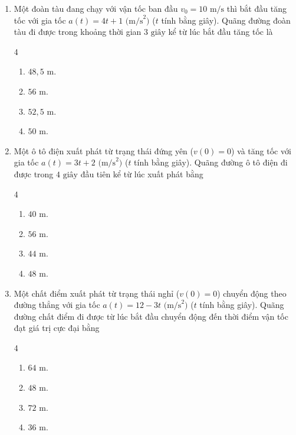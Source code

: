 \documentclass[12pt]{article}
\begin{document}
\begin{enumerate}[label=\textbf{Câu \arabic*.}]
		\item Một đoàn tàu đang chạy với vận tốc ban đầu $v_0 = 10\text{ m/s}$ thì bắt đầu tăng tốc với gia tốc $a(t) = 4t + 1\text{ (m/s}^2\text{)}$ ($t$ tính bằng giây). Quãng đường đoàn tàu đi được trong khoảng thời gian $3\text{ giây}$ kể từ lúc bắt đầu tăng tốc là
		\begin{multicols}{4}
			\begin{enumerate}[label=\textbf{\Alph*.}]
				\item $48{,}5\text{ m}$.
				\item $56\text{ m}$.
				\item $52{,}5\text{ m}$.
				\item $50\text{ m}$.
			\end{enumerate}
		\end{multicols}
		
		\item Một ô tô điện xuất phát từ trạng thái đứng yên ($v(0) = 0$) và tăng tốc với gia tốc $a(t) = 3t + 2\text{ (m/s}^2\text{)}$ ($t$ tính bằng giây). Quãng đường ô tô điện đi được trong $4\text{ giây}$ đầu tiên kể từ lúc xuất phát bằng
		\begin{multicols}{4}
			\begin{enumerate}[label=\textbf{\Alph*.}]
				\item $40\text{ m}$.
				\item $56\text{ m}$.
				\item $44\text{ m}$.
				\item $48\text{ m}$.
			\end{enumerate}
		\end{multicols}
		
		\item Một chất điểm xuất phát từ trạng thái nghỉ ($v(0) = 0$) chuyển động theo đường thẳng với gia tốc $a(t) = 12 - 3t\text{ (m/s}^2\text{)}$ ($t$ tính bằng giây). Quãng đường chất điểm đi được từ lúc bắt đầu chuyển động đến thời điểm vận tốc đạt giá trị cực đại bằng
		\begin{multicols}{4}
			\begin{enumerate}[label=\textbf{\Alph*.}]
				\item $64\text{ m}$.
				\item $48\text{ m}$.
				\item $72\text{ m}$.
				\item $36\text{ m}$.
			\end{enumerate}
		\end{multicols}
		

\end{enumerate}
\end{document}
